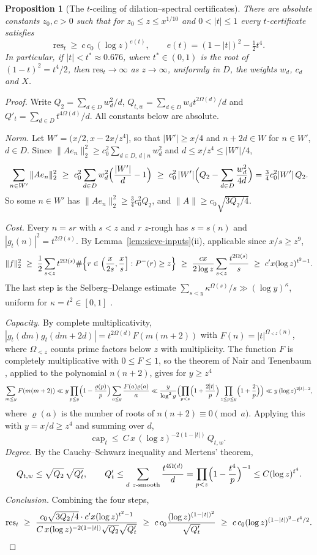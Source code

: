 \documentclass[11pt]{amsart}
\newtheorem{proposition}[theorem]{Proposition}
\theoremstyle{definition}
\theoremstyle{remark}
\newcommand{\res}{\mathrm{res}}
\newcommand{\capR}{\mathrm{cap}}
\begin{document}
\begin{proposition}[The $t$-ceiling of dilation--spectral certificates]\label{prop:T}
There are absolute constants $z_0,c>0$ such that for $z_0\le z\le x^{1/10}$ and $0<|t|\le1$ every $t$-certificate satisfies
\[
\res_t\ \ge\ c\,c_0\,(\log z)^{e(t)},\qquad e(t)=(1-|t|)^2-\tfrac12t^4 .
\]
In particular, if $|t|<t^*\approx0.676$, where $t^*\in(0,1)$ is the root of $(1-t)^2=t^4/2$, then $\res_t\to\infty$ as $z\to\infty$, uniformly in $D$, the weights $w_d$, $c_d$ and $X$.
\end{proposition}
\begin{proof}
Write $Q_2=\sum_{d\in D}w_d^2/d$, $Q_{t,w}=\sum_{d\in D}w_dt^{2\Omega(d)}/d$ and $Q'_t=\sum_{d\in D}t^{4\Omega(d)}/d$. All constants below are absolute.

\emph{Norm.} Let $W'=(x/2,x-2x/z^4]$, so that $|W'|\ge x/4$ and $n+2d\in W$ for $n\in W'$, $d\in D$. Since $\|Ae_n\|_2^2\ge c_0^2\sum_{d\in D,\,d\mid n}w_d^2$ and $d\le x/z^4\le|W'|/4$,
\[
\sum_{n\in W'}\|Ae_n\|_2^2\ \ge\ c_0^2\sum_{d\in D}w_d^2\Bigl(\frac{|W'|}d-1\Bigr)\ \ge\ c_0^2\,|W'|\Bigl(Q_2-\sum_{d\in D}\frac{w_d^2}{4d}\Bigr)=\tfrac34c_0^2|W'|\,Q_2 .
\]
So some $n\in W'$ has $\|Ae_n\|_2^2\ge\frac34c_0^2Q_2$, and $\|A\|\ge c_0\sqrt{3Q_2/4}$.

\emph{Cost.} Every $n=sr$ with $s<z$ and $r$ $z$-rough has $s=s(n)$ and $|g_t(n)|^2=t^{2\Omega(s)}$. By Lemma~\ref{lem:sieve-inputs}(ii), applicable since $x/s\ge z^9$,
\[
\|f\|_2^2\ \ge\ \frac12\sum_{s<z}t^{2\Omega(s)}\#\Bigl\{r\in\Bigl(\frac x{2s},\frac xs\Bigr]:P^-(r)\ge z\Bigr\}\ \ge\ \frac{cx}{2\log z}\sum_{s<z}\frac{t^{2\Omega(s)}}s\ \ge\ c'x(\log z)^{t^2-1}.
\]
The last step is the Selberg--Delange estimate $\sum_{s<y}\kappa^{\Omega(s)}/s\gg(\log y)^\kappa$, uniform for $\kappa=t^2\in[0,1]$ \cite[II.6]{Ten15}.

\emph{Capacity.} By complete multiplicativity, $|g_t(dm)g_t(dm+2d)|=t^{2\Omega(d)}F(m(m+2))$ with $F(n)=|t|^{\Omega_{<z}(n)}$, where $\Omega_{<z}$ counts prime factors below $z$ with multiplicity. The function $F$ is completely multiplicative with $0\le F\le1$, so the theorem of Nair and Tenenbaum \cite{NT98}, applied to the polynomial $n(n+2)$, gives for $y\ge z^4$
\[
\sum_{m\le y}F(m(m+2))\ll y\prod_{p\le y}\Bigl(1-\frac{\varrho(p)}p\Bigr)\sum_{a\le y}\frac{F(a)\varrho(a)}a\ll\frac y{\log^2y}\Bigl(\prod_{p<z}\Bigl(1+\frac{2|t|}p\Bigr)\prod_{z\le p\le y}\Bigl(1+\frac2p\Bigr)\Bigr)\ll y\,(\log z)^{2|t|-2},
\]
where $\varrho(a)$ is the number of roots of $n(n+2)\equiv0\pmod a$. Applying this with $y=x/d\ge z^4$ and summing over $d$,
\[
\capR_t\ \le\ C\,x\,(\log z)^{-2(1-|t|)}\,Q_{t,w} .
\]
\emph{Degree.} By the Cauchy--Schwarz inequality and Mertens' theorem,
\[
Q_{t,w}\le\sqrt{Q_2}\,\sqrt{Q'_t},\qquad Q'_t\le\sum_{d\ z\text{-smooth}}\frac{t^{4\Omega(d)}}d=\prod_{p<z}\Bigl(1-\frac{t^4}p\Bigr)^{-1}\le C(\log z)^{t^4}.
\]
\emph{Conclusion.} Combining the four steps,
\[
\res_t\ \ge\ \frac{c_0\sqrt{3Q_2/4}\cdot c'x(\log z)^{t^2-1}}{C\,x(\log z)^{-2(1-|t|)}\sqrt{Q_2}\sqrt{Q'_t}}\ \ge\ c\,c_0\frac{(\log z)^{(1-|t|)^2}}{\sqrt{Q'_t}}\ \ge\ c\,c_0(\log z)^{(1-|t|)^2-t^4/2}.\qedhere
\]
\end{proof}
\end{document}
